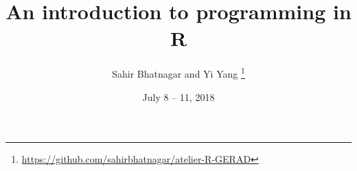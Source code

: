 \documentclass[11pt]{beamer}\usepackage[]{graphicx}\usepackage[]{color}
\begin{document}
\title[Intro to R]{An introduction to programming in R}

\author[]{Sahir Bhatnagar and Yi Yang%
\thanks{\href{https://github.com/sahirbhatnagar/atelier-R-GERAD}{https://github.com/sahirbhatnagar/atelier-R-GERAD}%
}}

\date{July 8 -- 11, 2018}


\maketitle

\end{document}
